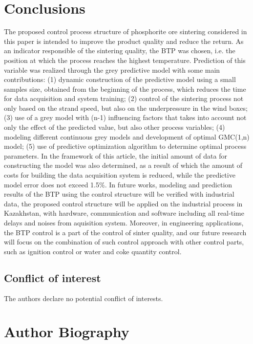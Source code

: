 \documentclass[AMS,STIX2COL]{WileyNJD-v2}
\begin{document}
\section{Conclusions} \label{Conclusion}
The proposed control process structure of phosphorite ore sintering considered in this paper is intended to improve the product quality and reduce the return. As an indicator responsible of the sintering quality, the BTP was chosen, i.e. the position at which the process reaches the highest temperature. Prediction of this variable was realized through the grey predictive model with some main contributions: (1) dynamic construction of the predictive model using a small samples size, obtained from the beginning of the process, which reduces the time for data acquisition and system training; (2) control of the sintering process not only based on the strand speed, but also on the underpressure in the wind boxes; (3) use of a grey model with (n-1) influencing factors that takes into account not only the effect of the predicted value, but also other process variables; (4) modeling different continuous grey models and development of optimal GMC(1,n) model; (5) use of predictive optimization algorithm to determine optimal process parameters. In the framework of this article, the initial amount of data for constructing the model was also determined, as a result of which the amount of costs for building the data acquisition system is reduced, while the predictive model error does not exceed 1.5\%.
In future works, modeling and prediction results of the BTP using the control structure will be verified with industrial data, the proposed control structure will be applied on the industrial process in Kazakhstan, with  hardware, communication and  software including all real-time delays and noises from aquisition system. Moreover, in engineering applications, the BTP control is a part of the control of sinter quality, and our future research will focus on the combination of such control approach with other control parts, such as ignition control or water and coke quantity control.


\subsection*{Conflict of interest}

The authors declare no potential conflict of interests.

\nocite{*}


\section*{Author Biography}
\end{document}
